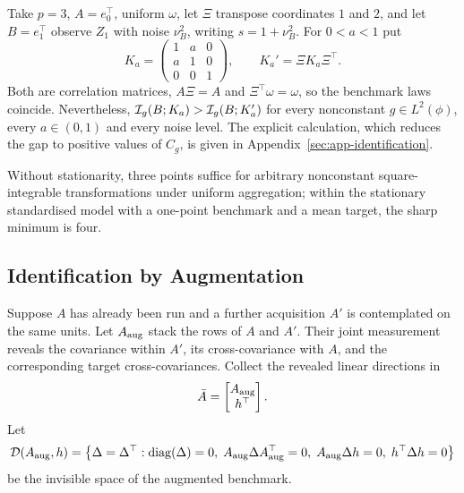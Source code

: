 \begin{example}
\label{ex:three-point}
Take $p=3$, $A=e_0^\top$, uniform $\omega$, let $\Xi$ transpose coordinates $1$
and $2$, and let $B=e_1^\top$ observe $Z_1$ with noise $\nu_B^2$, writing
$s=1+\nu_B^2$. For $0<a<1$ put
\begin{equation}
K_a=\begin{pmatrix}1&a&0\\a&1&0\\0&0&1\end{pmatrix},
\qquad K_a'=\Xi K_a\Xi^\top .
\label{eq:three-point}
\end{equation}
Both are correlation matrices, $A\Xi=A$ and $\Xi^\top\omega=\omega$, so the
benchmark laws coincide. Nevertheless,
$\mathcal{I}_g(B;K_a)>\mathcal{I}_g(B;K_a')$ for every nonconstant
$g\in L^2(\phi)$, every $a\in(0,1)$ and every noise level. The explicit
calculation, which reduces the gap to positive values of $C_g$, is given in
Appendix~\ref{sec:app-identification}.
\end{example}

Without stationarity, three points suffice for arbitrary nonconstant
square-integrable transformations under uniform aggregation; within the
stationary standardised model with a one-point benchmark and a mean target, the
sharp minimum is four.

\subsection{Identification by Augmentation}
\label{sec:augmentation}

Suppose $A$ has already been run and a further acquisition $A'$ is contemplated
on the same units. Let $A_{\rm aug}$ stack the rows of $A$ and $A'$. Their joint
measurement reveals the covariance within $A'$, its cross-covariance with $A$,
and the corresponding target cross-covariances. Collect the revealed linear
directions in
\begin{equation}
\bar A=\begin{bmatrix}A_{\rm aug}\\ h^\top\end{bmatrix} .
\label{eq:abar}
\end{equation}
Let
\begin{equation}
\mathcal{D}(A_{\rm aug},h)=\big\{\Delta=\Delta^\top:\operatorname{diag}(\Delta)=0,\;
A_{\rm aug}\Delta A_{\rm aug}^\top=0,\;
A_{\rm aug}\Delta h=0,\;h^\top\Delta h=0\big\}
\label{eq:joint-invisible}
\end{equation}
be the invisible space of the augmented benchmark.

